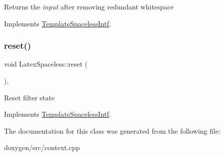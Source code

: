 Returns the {\itshape input} after removing redundant whitespace 

Implements \mbox{\hyperlink{class_template_spaceless_intf_aa68919027a4736005174cbdf9159a8a9}{Template\+Spaceless\+Intf}}.

\mbox{\label{class_latex_spaceless_a75d5def745f89afcbf59a948de20c0db}} 
\subsubsection{\texorpdfstring{reset()}{reset()}}
{\footnotesize\ttfamily void Latex\+Spaceless\+::reset (\begin{DoxyParamCaption}{ }\end{DoxyParamCaption})\hspace{0.3cm}{\ttfamily [inline]}, {\ttfamily [virtual]}}

Reset filter state 

Implements \mbox{\hyperlink{class_template_spaceless_intf_ae6f581a16baa634124ab2e798cc4064c}{Template\+Spaceless\+Intf}}.



The documentation for this class was generated from the following file\+:\begin{DoxyCompactItemize}
\item 
doxygen/src/context.\+cpp\end{DoxyCompactItemize}

